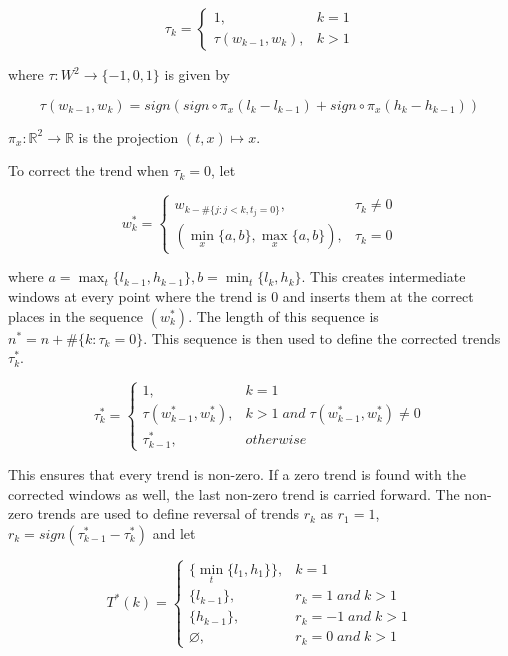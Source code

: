 \documentclass[a4paper, 12pt]{article}
\begin{document}
\begin{equation*}
    \tau_k = \begin{cases}
        1, & k = 1 \\
        \tau(w_{k-1}, w_k), & k > 1
    \end{cases}
\end{equation*}

where $\tau : W^2 \to \{-1,0,1\}$ is given by

\begin{equation*}
    \tau(w_{k-1}, w_k) = sign(sign \circ \pi_x(l_k - l_{k-1}) + sign \circ \pi_x(h_k - h_{k-1}))
\end{equation*}

$\pi_x : \mathbb{R}^2 \to \mathbb{R}$ is the projection $(t,x) \mapsto x$.

To correct the trend when $\tau_k = 0$, let 

\begin{equation*}
    w_k^* = \begin{cases}
        w_{k - \#\{j : j<k, t_j = 0\}}, & \tau_k \ne 0 \\
        (\min_x\{a,b\}, \max_x\{a,b\}), & \tau_k = 0
    \end{cases}
\end{equation*}

where $a = \max_t\{l_{k-1}, h_{k-1}\}, b = \min_t\{l_k, h_k\}$. This creates intermediate windows at every point where the trend is 0 and inserts them at the correct places in the sequence $(w_k^*)$. The length of this sequence is $n^* = n + \#\{k : \tau_k = 0\}$. This sequence is then used to define the corrected trends $\tau_k^*$.

\begin{equation*}
    \tau_k^* = \begin{cases}
        1, & k = 1 \\
        \tau(w_{k-1}^*, w_k^*), & k>1 \; and \;  \tau(w_{k-1}^*, w_k^*) \ne 0 \\
        \tau_{k-1}^*, & otherwise
    \end{cases}
\end{equation*}

This ensures that every trend is non-zero. If a zero trend is found with the corrected windows as well, the last non-zero trend is carried forward. The non-zero trends are used to define reversal of trends $r_k$ as $r_1 = 1$, $r_k = sign(\tau_{k-1}^* - \tau_k^*)$ and let

\begin{equation*}
    T^*(k) = \begin{cases}
        \{ \min_t\{l_1, h_1\} \}, & k = 1 \\
        \{ l_{k-1} \}, & r_k = 1 \; and \; k > 1 \\
        \{ h_{k-1} \}, & r_k = -1 \; and \; k > 1 \\
        \varnothing, & r_k = 0 \; and \; k > 1
    \end{cases}
\end{equation*}
\end{document}
